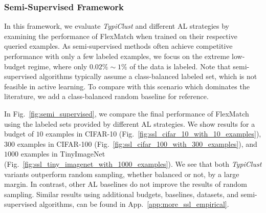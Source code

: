 \documentclass{article}
\newcommand{\app}{App.}
\begin{document}
\subsubsection{Semi-Supervised Framework} 
\label{sec:fwork:(iii)}

In this framework, we evaluate \emph{TypiClust} and different AL strategies by examining the performance of FlexMatch when trained on their respective queried examples.
As semi-supervised methods often achieve competitive performance with only a few labeled examples, we focus on the extreme low-budget regime, where only $0.02\%\sim1\%$ of the data is labeled. Note that semi-supervised algorithms typically assume a class-balanced labeled set, which is not feasible in active learning. To compare with this scenario which dominates the literature, we add a class-balanced random baseline for reference.

In Fig.~\ref{fig:semi_supervised}, we compare the final performance of FlexMatch using the labeled sets provided by different AL strategies. We show results for a budget of $10$ examples in CIFAR-10 (Fig.~\ref{fig:ssl_cifar_10_with_10_examples}), $300$ examples in CIFAR-100 (Fig.~\ref{fig:ssl_cifar_100_with_300_examples}), and $1000$ examples in TinyImageNet (Fig.~\ref{fig:ssl_tiny_imagenet_with_1000_examples}). We see that both \emph{TypiClust} variants outperform random sampling, whether balanced or not, by a large margin. In contrast, other AL baselines do not improve the results of random sampling. Similar results using additional budgets, baselines, datasets, and semi-supervised algorithms, can be found in \app~\ref{app:more_ssl_empirical}.
\end{document}
